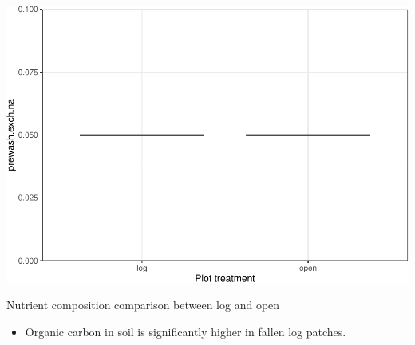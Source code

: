 \documentclass[
]{article}
\providecommand{\tightlist}{%
  \setlength{\itemsep}{0pt}\setlength{\parskip}{0pt}}
\begin{document}
\includegraphics{log-project-aubrie-winnie_files/figure-latex/unnamed-chunk-8-12.pdf}

Nutrient composition comparison between log and open

\begin{itemize}
\tightlist
\item
  Organic carbon in soil is significantly higher in fallen log patches.
\end{itemize}
\end{document}
